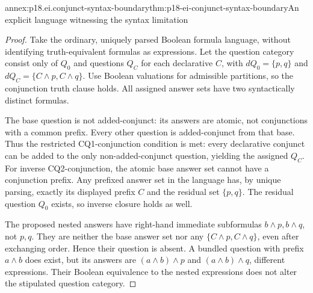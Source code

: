 \begin{annexitem}{annex:p18.ei.conjunct-syntax-boundary}{thm:p18-ei-conjunct-syntax-boundary}{An explicit language witnessing the syntax limitation}
\begin{proof}
Take the ordinary, uniquely parsed Boolean formula language, without identifying
truth-equivalent formulas as expressions. Let the question category consist
only of \(Q_0\) and questions \(Q_C\) for each declarative \(C\), with
\(dQ_0=\{p,q\}\) and \(dQ_C=\{C\land p,C\land q\}\).
Use Boolean valuations for admissible partitions, so the conjunction truth
clause holds. All assigned answer sets have two syntactically distinct formulas.

The base question is not added-conjunct: its answers are atomic, not
conjunctions with a common prefix. Every other question is added-conjunct
from that base. Thus the restricted CQ1-conjunction condition is met: every
declarative conjunct can be added to the only non-added-conjunct question,
yielding the assigned \(Q_C\). For inverse CQ2-conjunction, the atomic base
answer set cannot have a conjunction prefix. Any prefixed answer set in the
language has, by unique parsing, exactly its displayed prefix \(C\) and
the residual set \(\{p,q\}\). The residual question \(Q_0\) exists, so
inverse closure holds as well.

The proposed nested answers have right-hand immediate subformulas
\(b\land p,b\land q\), not \(p,q\). They are neither the base answer
set nor any \(\{C\land p,C\land q\}\), even after exchanging order.
Hence their question is absent. A bundled question with prefix \(a\land b\)
does exist, but its answers are \((a\land b)\land p\) and
\((a\land b)\land q\), different expressions. Their Boolean equivalence
to the nested expressions does not alter the stipulated question category.
\end{proof}
\end{annexitem}

